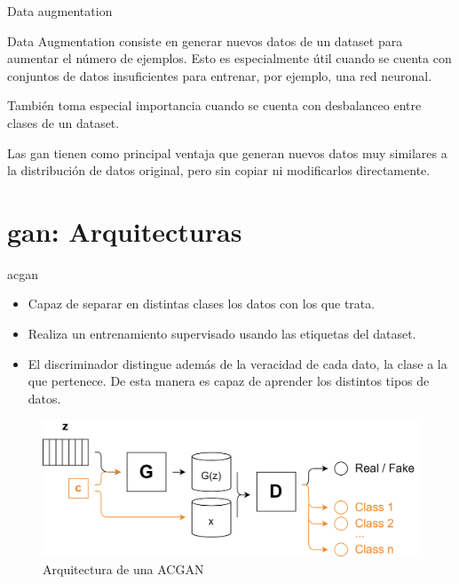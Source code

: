 \begin{frame}{Data augmentation}

    Data Augmentation consiste en generar \alert{nuevos datos} de un dataset para aumentar el número de ejemplos. Esto es especialmente útil cuando se cuenta con conjuntos de datos \alert{insuficientes} para entrenar, por ejemplo, una red neuronal.
    
    También toma especial importancia cuando se cuenta con \alert{desbalanceo} entre clases de un dataset.
    
    Las \gls{gan} tienen como principal ventaja que generan nuevos datos muy similares a la distribución de datos original, pero sin copiar ni modificarlos directamente.
    
\end{frame}

\section{\gls{gan}: Arquitecturas}

\begin{frame}{\gls{acgan}\cite{odena2016conditional}}

    \begin{itemize}
        \item Capaz de separar en distintas \alert{clases} los datos con los que trata.
        \item Realiza un entrenamiento \alert{supervisado} usando las etiquetas del dataset.
        \item El discriminador distingue además de la \alert{veracidad} de cada dato, la clase a la que pertenece. De esta manera es capaz de aprender los distintos tipos de datos.
    \end{itemize}
    
    \begin{figure}
        \centering
        \includegraphics[width=\textwidth]{Slides/figures/GAN/ACGAN.png}
        \caption{Arquitectura de una ACGAN}
    \end{figure}
    
\end{frame}

